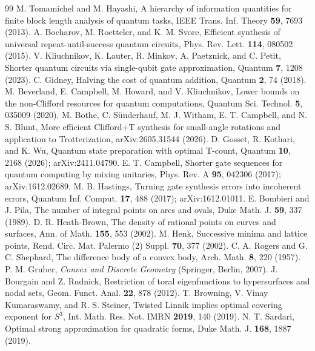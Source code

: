 \documentclass[aps,prx,twocolumn,superscriptaddress,nofootinbib,longbibliography]{revtex4-2}
\theoremstyle{plain}
\theoremstyle{definition}
\theoremstyle{remark}
\begin{document}
\begin{thebibliography}{99}
 M. Tomamichel and M. Hayashi, A hierarchy of information quantities for finite block length analysis of quantum tasks, IEEE Trans. Inf. Theory \textbf{59}, 7693 (2013).
 A. Bocharov, M. Roetteler, and K. M. Svore, Efficient synthesis of universal repeat-until-success quantum circuits, Phys. Rev. Lett. \textbf{114}, 080502 (2015).
 V. Kliuchnikov, K. Lauter, R. Minkov, A. Paetznick, and C. Petit, Shorter quantum circuits via single-qubit gate approximation, Quantum \textbf{7}, 1208 (2023).
 C. Gidney, Halving the cost of quantum addition, Quantum \textbf{2}, 74 (2018).
 M. Beverland, E. Campbell, M. Howard, and V. Kliuchnikov, Lower bounds on the non-Clifford resources for quantum computations, Quantum Sci. Technol. \textbf{5}, 035009 (2020).
 M. Bothe, C. S\"underhauf, M. J. Witham, E. T. Campbell, and N. S. Blunt, More efficient Clifford+T synthesis for small-angle rotations and application to Trotterization, arXiv:2605.31544 (2026).
 D. Gosset, R. Kothari, and K. Wu, Quantum state preparation with optimal T-count, Quantum \textbf{10}, 2168 (2026); arXiv:2411.04790.
 E. T. Campbell, Shorter gate sequences for quantum computing by mixing unitaries, Phys. Rev. A \textbf{95}, 042306 (2017); arXiv:1612.02689.
 M. B. Hastings, Turning gate synthesis errors into incoherent errors, Quantum Inf. Comput. \textbf{17}, 488 (2017); arXiv:1612.01011.
 E. Bombieri and J. Pila, The number of integral points on arcs and ovals, Duke Math. J. \textbf{59}, 337 (1989).
 D. R. Heath-Brown, The density of rational points on curves and surfaces, Ann. of Math. \textbf{155}, 553 (2002).
 M. Henk, Successive minima and lattice points, Rend. Circ. Mat. Palermo (2) Suppl. \textbf{70}, 377 (2002).
 C. A. Rogers and G. C. Shephard, The difference body of a convex body, Arch. Math. \textbf{8}, 220 (1957).
 P. M. Gruber, \emph{Convex and Discrete Geometry} (Springer, Berlin, 2007).
 J. Bourgain and Z. Rudnick, Restriction of toral eigenfunctions to hypersurfaces and nodal sets, Geom. Funct. Anal. \textbf{22}, 878 (2012).
 T. Browning, V. Vinay Kumaraswamy, and R. S. Steiner, Twisted Linnik implies optimal covering exponent for $S^3$, Int. Math. Res. Not. IMRN \textbf{2019}, 140 (2019).
 N. T. Sardari, Optimal strong approximation for quadratic forms, Duke Math. J. \textbf{168}, 1887 (2019).

\end{thebibliography}
\end{document}
